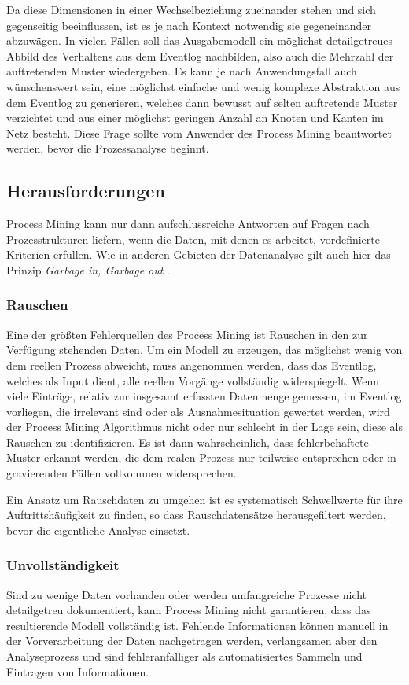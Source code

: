 Da diese Dimensionen in einer Wechselbeziehung zueinander stehen und sich gegenseitig beeinflussen, ist es je nach Kontext notwendig sie gegeneinander abzuwägen. In vielen Fällen soll das Ausgabemodell ein möglichst detailgetreues Abbild des Verhaltens aus dem Eventlog nachbilden, also auch die Mehrzahl der auftretenden Muster wiedergeben. 
Es kann je nach Anwendungsfall auch wünschenswert sein, eine möglichst einfache und wenig komplexe Abstraktion aus dem Eventlog zu generieren, welches dann bewusst auf selten auftretende Muster  verzichtet und aus einer möglichst geringen Anzahl an Knoten und Kanten im Netz besteht. Diese Frage sollte vom Anwender des Process Mining beantwortet werden, bevor die Prozessanalyse beginnt.

\subsection{Herausforderungen}\label{challanges}
Process Mining kann nur dann aufschlussreiche Antworten auf Fragen nach Prozesstrukturen liefern, wenn die Daten, mit denen es arbeitet, vordefinierte Kriterien erfüllen. Wie in anderen Gebieten der Datenanalyse gilt auch hier das Prinzip \textit{Garbage in, Garbage out} \cite{GIGO}. 

\subsubsection{Rauschen}
Eine der größten Fehlerquellen des Process Mining ist Rauschen in den zur Verfügung stehenden Daten. Um ein Modell zu erzeugen, das möglichst wenig von dem reellen Prozess abweicht, muss angenommen werden, dass das Eventlog, welches als Input dient, alle reellen Vorgänge vollständig widerspiegelt. Wenn viele Einträge, relativ zur insgesamt erfassten Datenmenge gemessen, im Eventlog vorliegen, die irrelevant sind oder als Ausnahmesituation gewertet werden, wird der Process Mining Algorithmus nicht oder nur schlecht in der Lage sein, diese als Rauschen zu identifizieren. Es ist dann wahrscheinlich, dass fehlerbehaftete Muster erkannt werden, die dem realen Prozess nur teilweise entsprechen oder in gravierenden Fällen vollkommen widersprechen.

Ein Ansatz um Rauschdaten zu umgehen ist es systematisch Schwellwerte für ihre Auftrittshäufigkeit zu finden, so dass Rauschdatensätze herausgefiltert werden, bevor die eigentliche Analyse einsetzt. 

\subsubsection{Unvollständigkeit}
Sind zu wenige Daten vorhanden oder werden umfangreiche Prozesse nicht detailgetreu dokumentiert, kann Process Mining nicht garantieren, dass das resultierende Modell vollständig ist. 
Fehlende Informationen können manuell in der Vorverarbeitung der Daten nachgetragen werden, verlangsamen aber den Analyseprozess und sind fehleranfälliger als automatisiertes Sammeln und Eintragen von Informationen. 

